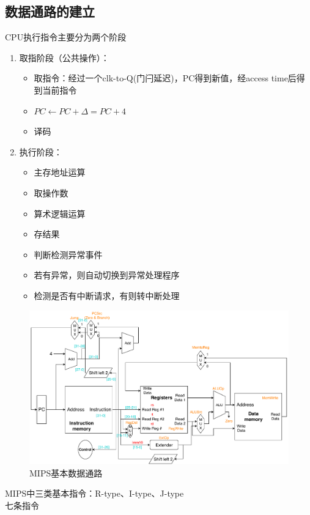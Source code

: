 \subsection{数据通路的建立}
CPU执行指令主要分为两个阶段
\begin{enumerate}
	\item 取指阶段（公共操作）：
	\begin{itemize}
		\item 取指令：经过一个clk-to-Q(门闩延迟)，PC得到新值，经access time后得到当前指令
		\item $PC\gets PC+\Delta=PC+4$
		\item 译码
	\end{itemize}
	\item 执行阶段：
	\begin{itemize}
		\item 主存地址运算
		\item 取操作数
		\item 算术逻辑运算
		\item 存结果
		\item 判断检测异常事件
		\item 若有异常，则自动切换到异常处理程序
		\item 检测是否有中断请求，有则转中断处理
	\end{itemize}
\end{enumerate}
\begin{figure}[htbp]
\centering
\includegraphics[width=\linewidth]{fig/Datapath_All.pdf}
\caption{MIPS基本数据通路}
\end{figure}
MIPS中三类基本指令：R-type、I-type、J-type\\
七条指令
